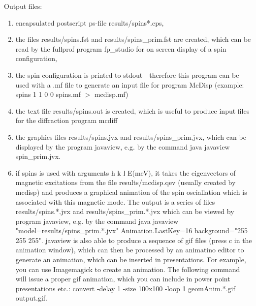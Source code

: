 Output files:
\begin{enumerate}
  \item encapsulated postscript ps-file {\prg results/spins*.eps}, 
  \item the files {\prg results/spins.fst} and {\prg results/spins\_prim.fst} are created, 
                which can be read by the fullprof program {\prg fp\_studio}
                for on screen display of a spin configuration,
  \item the spin-configuration is printed to stdout - therefore
                               this program can be used with a .mf file 
			       to generate an input file
			       for program {\prg  McDisp} (example: {\prg spins 1 1 0 0 spins.mf $>$ mcdisp.mf})  
  \item the text file {\prg results/spins.out} is created, which is useful to produce input files for
              the diffraction program {\prg mcdiff}
  \item the graphics files {\prg results/spins.jvx} and {\prg results/spins\_prim.jvx}, which can be displayed
         by the program {\prg javaview}, e.g. by the command {\prg java javaview spin\_prim.jvx}.
  \item if {\prg spins} is used with arguments {\prg h k l E(meV)}, it takes the eigenvectors of magnetic %
excitations
        from the file {\prg results/mcdisp.qev} (usually created by {\prg mcdisp}) and produces a graphical
        animation of the spin osciallation which is associated with this magnetic mode. The output is a series
        of files {\prg results/spins.*.jvx} and {\prg results/spins\_prim.*.jvx} which can be viewed by program
        {\prg javaview}, e.g. by the command {\prg java javaview "model=results/spins\_prim.*.jvx" 
        Animation.LastKey=16 background="255 255 255"}.  {\prg javaview} is also able to produce a sequence
		of gif files (press c in the animation window), which can then be processed by an animatino editor
		to generate an animation, which can be inserted in presentations. For example, you can use {\prg %
Imagemagick}
        to create an animation. The following command will issue a proper gif animation, which you can include in %
power point        
        presentations etc.: {\prg convert -delay 1 -size 100x100 -loop 1 geomAnim.*.gif output.gif}.
 \end{enumerate}

